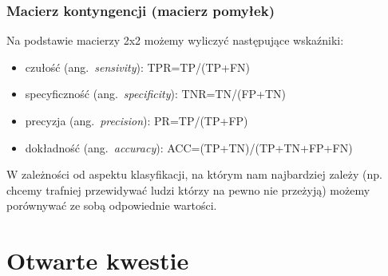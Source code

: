 \documentclass{article}
\newcommand{\TODO}[1]{\textcolor{blue}{TODO: #1}}
\newcommand{\ang}[1]{ang.~{\itshape #1}}
\begin{document}
\subsubsection{Macierz kontyngencji (macierz pomyłek)}
Na podstawie macierzy 2x2 możemy wyliczyć następujące wskaźniki:
\begin{itemize}
\item czułość (\ang{sensivity}): TPR=TP/(TP+FN)
\item specyficzność (\ang{specificity}): TNR=TN/(FP+TN)
\item precyzja (\ang{precision}): PR=TP/(TP+FP)
\item dokładność (\ang{accuracy}): ACC=(TP+TN)/(TP+TN+FP+FN)
\end{itemize}

W zależności od aspektu klasyfikacji, na którym nam najbardziej zależy (np. chcemy trafniej przewidywać ludzi którzy na pewno nie przeżyją) możemy porównywać ze sobą odpowiednie wartości.

\section{Otwarte kwestie}
\end{document}
